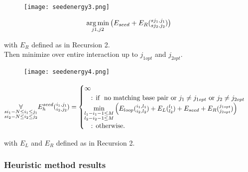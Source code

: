 \begin{figure}[H]
	\centering
	\texttt{[image: seedenergy3.png]}
\end{figure}

\begin{equation*}
\underset{j1, j2}{\arg\min}
\begin{pmatrix}
E_{seed} + E_{R}(\substack{sj_1,j_1\\sj_2,j_2})
\end{pmatrix}\\
\end{equation*}

with $E_{R}$ defined as in Recursion 2.\\
Then minimize over entire interaction up to $j_{1opt}$ and $j_{2opt}$.

\begin{figure}[H]
	\centering
	\texttt{[image: seedenergy4.png]}
\end{figure}

\begin{equation*}
\underset{\substack{si_{1}-N \le i_{1} \le j_{1}\\si_{2}-N \le i_{2} \le j_{2}}}{\forall}\\
E_{h}^{seed}(\substack{i_1, j_1\\i_2, j_2}) = \begin{cases}
\infty\\
\quad\text{: if } \text{ no matching base pair or $j_1 \neq j_{1opt}$ or $j_2 \neq j_{2opt}$ }\\
\min\limits_{\substack{l_{1} - i_{1} - 1 \le M\\l_{2} - i_{2} - 1 \le M}}
\begin{pmatrix}
E_{loop}(\substack{i_1,l_1\\i_2,l_2}) + E_{L}(\substack{l_1\\l_2}) + E_{seed} + E_{R}(\substack{j_{1opt}\\j_{2opt}})
\end{pmatrix}\\
\quad\text{: otherwise.}\\

\end{cases}
\end{equation*}

with $E_{L}$ and $E_{R}$ defined as in Recursion 2.\\

\clearpage

\subsubsection{Heuristic method results}

